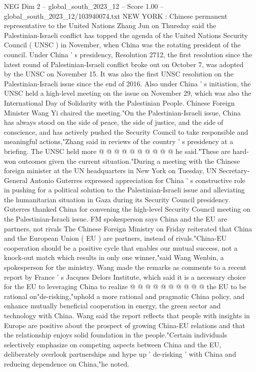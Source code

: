 \begin{textsample}{NEG Dim 2 – global\_south\_2023\_12 – Score 1.00 – global\_south\_2023\_12/103940074.txt}  \label{ex:f2_neg_285}
NEW YORK : Chinese permanent representative to the United Nations Zhang Jun on Thursday said the Palestinian-Israeli conflict has topped the agenda of the United Nations Security Council ( UNSC ) in November, when China was the rotating president of the council.
Under China ' s presidency, Resolution 2712, the first resolution since the latest round of Palestinian-Israeli conflict broke out on October 7, was adopted by the UNSC on November 15.
It was also the first UNSC resolution on the Palestinian-Israeli issue since the end of 2016.
Also under China ' s initiation, the UNSC held a high-level meeting on the issue on November 29, which was also the International Day of Solidarity with the Palestinian People.
Chinese Foreign Minister Wang Yi chaired the meeting."On the Palestinian-Israeli issue, China has always stood on the side of peace, the side of justice, and the side of conscience, and has actively pushed the Security Council to take responsible and meaningful actions,"Zhang said in reviews of the country ' s presidency at a briefing.
The UNSC held more @ @ @ @ @ @ @ @ @ @ he said."These are hard-won outcomes given the current situation."During a meeting with the Chinese foreign minister at the UN headquarters in New York on Tuesday, UN Secretary-General Antonio Guterres expressed appreciation for China ' s constructive role in pushing for a political solution to the Palestinian-Israeli issue and alleviating the humanitarian situation in Gaza during its Security Council presidency.
Guterres thanked China for convening the high-level Security Council meeting on the Palestinian-Israeli issue.
FM spokesperson says China and the EU are partners, not rivals The Chinese Foreign Ministry on Friday reiterated that China and the European Union ( EU ) are partners, instead of rivals."China-EU cooperation should be a positive cycle that enables our mutual success, not a knock-out match which results in only one winner,"said Wang Wenbin, a spokesperson for the ministry.
Wang made the remarks as comments to a recent report by France ' s Jacques Delors Institute, which said it is a necessary choice for the EU to leveraging China to realize @ @ @ @ @ @ @ @ @ @ the EU to be rational on"de-risking,"uphold a more rational and pragmatic China policy, and enhance mutually beneficial cooperation in energy, the green sector and technology with China.
Wang said the report reflects that people with insights in Europe are positive about the prospect of growing China-EU relations and that the relationship enjoys solid foundation in the people."Certain individuals selectively emphasize on competing aspects between China and the EU, deliberately overlook partnerships and hype up ' de-risking ' with China and reducing dependence on China,"he noted.

\end{textsample}
